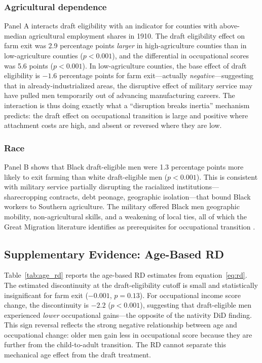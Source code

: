 \documentclass[12pt]{article}
\begin{document}
\subsubsection*{Agricultural dependence} Panel A interacts draft eligibility with an indicator for counties with above-median agricultural employment shares in 1910. The draft eligibility effect on farm exit was 2.9 percentage points \textit{larger} in high-agriculture counties than in low-agriculture counties ($p < 0.001$), and the differential in occupational scores was 5.6 points ($p < 0.001$). In low-agriculture counties, the base effect of draft eligibility is $-1.6$ percentage points for farm exit---actually \textit{negative}---suggesting that in already-industrialized areas, the disruptive effect of military service may have pulled men temporarily out of advancing manufacturing careers. The interaction is thus doing exactly what a ``disruption breaks inertia'' mechanism predicts: the draft effect on occupational transition is large and positive where attachment costs are high, and absent or reversed where they are low.

\subsubsection*{Race} Panel B shows that Black draft-eligible men were 1.3 percentage points more likely to exit farming than white draft-eligible men ($p < 0.001$). This is consistent with military service partially disrupting the racialized institutions---sharecropping contracts, debt peonage, geographic isolation---that bound Black workers to Southern agriculture. The military offered Black men geographic mobility, non-agricultural skills, and a weakening of local ties, all of which the Great Migration literature identifies as prerequisites for occupational transition \citep{collins2014, hornbeck2014}.



\subsection{Supplementary Evidence: Age-Based RD}

Table~\ref{tab:age_rd} reports the age-based RD estimates from equation~\eqref{eq:rd}. The estimated discontinuity at the draft-eligibility cutoff is small and statistically insignificant for farm exit ($-0.001$, $p = 0.13$). For occupational income score change, the discontinuity is $-2.2$ ($p < 0.001$), suggesting that draft-eligible men experienced \textit{lower} occupational gains---the opposite of the nativity DiD finding. This sign reversal reflects the strong negative relationship between age and occupational change: older men gain less in occupational score because they are further from the child-to-adult transition. The RD cannot separate this mechanical age effect from the draft treatment.
\end{document}
